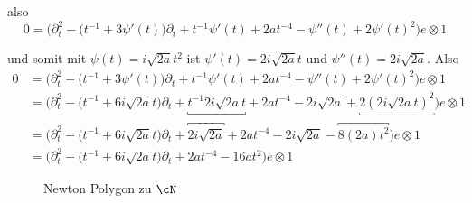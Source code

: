 also
\[
0 = \Big(\partial_t^2 - \big(t^{-1} + 3\psi'(t)\big)\partial_t
    + t^{-1} \psi'(t) + 2at^{-4} -\psi''(t)
    + 2 \psi'(t)^2\Big) e\otimes 1
\]
\begin{try}
und somit mit $\psi(t)=i\sqrt{2a}t^2$ ist $\psi'(t)=2i\sqrt{2a}t$ und
$\psi''(t)=2i\sqrt{2a}$. Also
\begin{align*}
0 &= \Big(\partial_t^2 - \big(t^{-1} + 3\psi'(t)\big)\partial_t
    + t^{-1} \psi'(t) + 2at^{-4} -\psi''(t)
    + 2 \psi'(t)^2\Big) e\otimes 1
\\&= \Big(\partial_t^2 - \big(t^{-1} + 6i\sqrt{2a}t\big)\partial_t
    + \underbracket{t^{-1} 2i\sqrt{2a}t} + 2at^{-4} - 2i\sqrt{2a}
    + \underbracket{2 (2i\sqrt{2a}t)^2}\Big) e\otimes 1
\\&= \Big(\partial_t^2 - \big(t^{-1} + 6i\sqrt{2a}t\big)\partial_t
    + \overbracket{2i\sqrt{2a}} + 2at^{-4} - 2i\sqrt{2a}
    - \overbracket{8 (2a) t^2}\Big) e\otimes 1
\\&= \Big(\partial_t^2 - \big(t^{-1} + 6i\sqrt{2a}t\big)\partial_t
    + 2at^{-4} - 16a t^2\Big) e\otimes 1
\end{align*}
\begin{figure}[H]
\caption{Newton Polygon zu $\cN$}
\begin{center}
\end{center}
\end{figure}
\begin{comment}
Hier entsteht KEIN regulären Anteil, es gibt noch nicht mal einen zweiten
Slope.
\end{comment}
\end{try}
